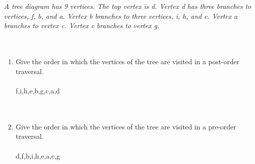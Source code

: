 \\\\
{\color{blue}{\bf Figure 14:} \emph{A tree diagram has 9 vertices. The top vertex is d. Vertex d has three branches to vertices, f, b, and a. Vertex b branches to three vertices, i, h, and e. Vertex a branches to vertex c. Vertex c branches to vertex g.
\\
}
}
\\
\\
\begin{enumerate}[label=(\alph*)]
\item Give the order in which the vertices of the tree are visited in a post-order traversal.\\\\
f,i,h,e,b,g,c,a,d \\

\\\\
\item Give the order in which the vertices of the tree are visited in a pre-order traversal.\\\\
d,f,b,i,h,e,a,c,g \\

\\\\
\end{enumerate}


 \newpage

